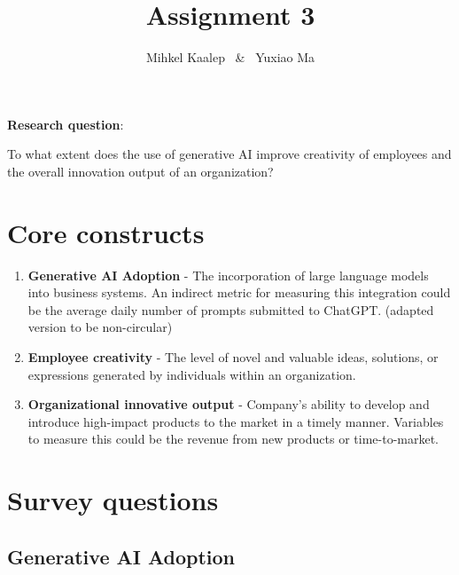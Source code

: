 \documentclass[UTF8,a4paper,AutoFakeBold,AutoFakeSlant]{article}
\title{\textbf{\textsf{{\textsf{Assignment 3}}}}}
\author{\tnewroman Mihkel Kaalep ~\&~ Yuxiao Ma}
\date{}
\begin{document}
\maketitle

\textbf{Research question}:

To what extent does the use of generative AI improve creativity of employees and the overall innovation output of an organization?

\section{Core constructs}

\begin{enumerate}
    \item \textbf{Generative AI Adoption} - The incorporation of large language models into business systems. An indirect metric for measuring this integration could be the average daily number of prompts submitted to ChatGPT. (adapted version to be non-circular)
    \item \textbf{Employee creativity} - The level of novel and valuable ideas, solutions, or expressions generated by individuals within an organization.
    \item \textbf{Organizational innovative output} - Company’s ability to develop and introduce high-impact products to the market in a timely manner. Variables to measure this could be the revenue from new products or time-to-market.
\end{enumerate}


\section{Survey questions}

\subsection{Generative AI Adoption}
\end{document}
